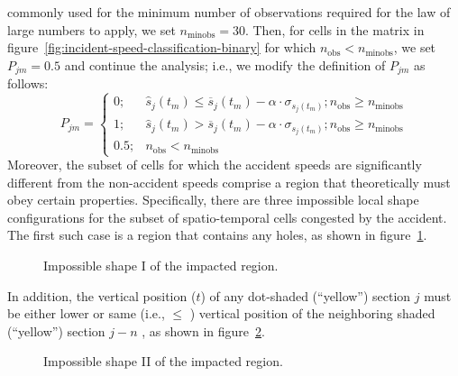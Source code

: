 \documentclass[12pt]{report}
\newcommand{\inputTikZ}[1]{%
    \begin{singlespace}
    \end{singlespace}
  }
\newcommand{\inputTikZ}[1]{%
    \begin{singlespace}
    \beginpgfgraphicnamed{#1-external}%
    \endpgfgraphicnamed%
    \end{singlespace}
  }
\newcounter{time}
\newcounter{space}
\begin{document}
commonly used for the minimum number of observations required for the
law of large numbers to apply, we set $n_{\textrm{minobs}} =
30$. Then, for cells in the matrix in
figure~\ref{fig:incident-speed-classification-binary} for which
$n_{\mathrm{obs}} < n_{\textrm{minobs}}$, we set $P_{jm} = 0.5$ and
continue the analysis; i.e., we modify the definition of $P_{jm}$ as
follows:
\begin{equation}
  \label{eq:pjm-final}
  P_{jm} = 
  \begin{cases}
    0;& \hat{s}_j(t_m) \le \overline{s}_j(t_m) - \alpha\cdot\sigma_{s_j(t_m)}; n_{\mathrm{obs}} \ge n_{\textrm{minobs}}\\
    1;& \hat{s}_j(t_m) > \overline{s}_j(t_m) - \alpha\cdot\sigma_{s_j(t_m)}; n_{\mathrm{obs}} \ge n_{\textrm{minobs}}\\
    0.5;& n_{\mathrm{obs}} < n_{\textrm{minobs}}
  \end{cases}
\end{equation}
Moreover, the subset of cells for which the accident speeds are
significantly different from the non-accident speeds comprise a region
that theoretically must obey certain properties. Specifically, there
are three impossible local shape configurations for the subset of
spatio-temporal cells congested by the accident. The first such case
is a region that contains any holes, as shown in
figure~\ref{fig:time-space-incident-schematic-infeasible-1}.
\begin{figure}[t]
  \begin{center}
    \inputTikZ{figs/time-space-incident-schematic-infeasible-1}
    \caption[Impossible shape I of the impacted region]{Impossible shape I of the impacted region.}
    \label{fig:time-space-incident-schematic-infeasible-1}
  \end{center}
\end{figure}
In addition, the vertical position ($t$) of any dot-shaded
(``yellow'') section $j$ must be either lower or same (i.e., $\le$ )
vertical position of the neighboring shaded (``yellow'') section $j -
n$ , as shown in
figure~\ref{fig:time-space-incident-schematic-infeasible-2}.
\begin{figure}[t]
  \begin{center}
    \inputTikZ{figs/time-space-incident-schematic-infeasible-2}
    \caption[Impossible shape II of the impacted region]{Impossible shape II of the impacted region.}
    \label{fig:time-space-incident-schematic-infeasible-2}
  \end{center}
\end{figure}
\end{document}
